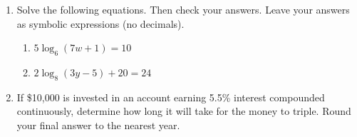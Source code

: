 


\begin{enumerate}
\item  Solve the following equations.  Then check your answers.  Leave your answers as symbolic expressions (no decimals).
\begin{enumerate}
\item $\displaystyle 5\log_6(7w+1)=10$
\vfill
\item $2\log_8(3y-5)+20=24$
\vfill


\end{enumerate}

\newpage

\item If \$10,000 is invested in an account earning 5.5\% interest compounded continuously, determine how long it will take for the money to triple.  Round your final answer to the nearest year.




\end{enumerate}



